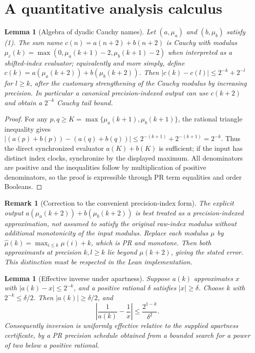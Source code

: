 \documentclass[11pt]{article}
\newtheorem{lemma}[theorem]{Lemma}
\newtheorem{remark}[theorem]{Remark}
\begin{document}
\section{A quantitative analysis calculus}
\begin{lemma}[Algebra of dyadic Cauchy names]
Let $(a,\mu_a)$ and $(b,\mu_b)$ satisfy (1). The sum name $c(n)=a(n+2)+b(n+2)$ is Cauchy with modulus $\mu_c(k)=\max(0,\mu_a(k+1)-2,\mu_b(k+1)-2)$ when interpreted as a shifted-index evaluator; equivalently and more simply, define $c(k)=a(\mu_a(k+2))+b(\mu_b(k+2))$. Then $|c(k)-c(l)|\le 2^{-k}+2^{-l}$ for $l\ge k$, after the customary strengthening of the Cauchy modulus by increasing precision. In particular a canonical precision-indexed output can use $c(k+2)$ and obtain a $2^{-k}$ Cauchy tail bound.
\end{lemma}
\begin{proof}
For any $p,q\ge K=\max\{\mu_a(k+1),\mu_b(k+1)\}$, the rational triangle inequality gives
$|(a(p)+b(p))-(a(q)+b(q))|\le2^{-(k+1)}+2^{-(k+1)}=2^{-k}$. Thus the direct synchronized evaluator $a(K)+b(K)$ is sufficient; if the input has distinct index clocks, synchronize by the displayed maximum. All denominators are positive and the inequalities follow by multiplication of positive denominators, so the proof is expressible through PR term equalities and order Booleans.\end{proof}
\begin{remark}[Correction to the convenient precision-index form]
The explicit output $a(\mu_a(k+2))+b(\mu_b(k+2))$ is best treated as a \emph{precision-indexed approximation}, not assumed to satisfy the original raw-index modulus without additional monotonicity of the input modulus. Replace each modulus $\mu$ by $\widehat\mu(k)=\max_{i\le k}\mu(i)+k$, which is PR and monotone. Then both approximants at precision $k,l\ge k$ lie beyond $\mu(k+2)$, giving the stated error. This distinction must be respected in the Lean implementation.
\end{remark}
\begin{lemma}[Effective inverse under apartness]
Suppose $a(k)$ approximates $x$ with $|a(k)-x|\le2^{-k}$, and a positive rational $\delta$ satisfies $|x|\ge\delta$. Choose $k$ with $2^{-k}\le\delta/2$. Then $|a(k)|\ge\delta/2$, and
\[\left|\frac1{a(k)}-\frac1x\right|\le \frac{2^{1-k}}{\delta^2}.\tag{2}\]
Consequently inversion is uniformly effective relative to the supplied apartness certificate, by a PR precision schedule obtained from a bounded search for a power of two below a positive rational.
\end{lemma}
\end{document}
